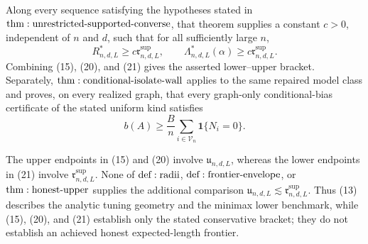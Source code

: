 Along every sequence satisfying the hypotheses stated in \({\rm thm:unrestricted\text{-}supported\text{-}converse}\), that theorem supplies a constant \(c>0\), independent of \(n\) and \(d\), such that for all sufficiently large \(n\),
\[
 R^*_{n,d,L}\geq c\mathfrak r^{\mathrm{sup}}_{n,d,L},
 \qquad
 \Lambda^*_{n,d,L}(\alpha)
 \geq c\mathfrak r^{\mathrm{sup}}_{n,d,L}.
\tag{21}
\]
Combining (15), (20), and (21) gives the asserted lower--upper bracket.  Separately, \({\rm thm:conditional\text{-}isolate\text{-}wall}\) applies to the same repaired model class and proves, on every realized graph, that every graph-only conditional-bias certificate of the stated uniform kind satisfies
\[
 b(A)\geq\frac{B}{n}\sum_{i\in\mathcal V_n}\mathbf1\{N_i=0\}.
\tag{22}
\]

The upper endpoints in (15) and (20) involve \(\mathfrak u_{n,d,L}\), whereas the lower endpoints in (21) involve \(\mathfrak r^{\mathrm{sup}}_{n,d,L}\).  None of \({\rm def:radii}\), \({\rm def:frontier\text{-}envelope}\), or \({\rm thm:honest\text{-}upper}\) supplies the additional comparison \(\mathfrak u_{n,d,L}\lesssim\mathfrak r^{\mathrm{sup}}_{n,d,L}\).  Thus (13) describes the analytic tuning geometry and the minimax lower benchmark, while (15), (20), and (21) establish only the stated conservative bracket; they do not establish an achieved honest expected-length frontier.